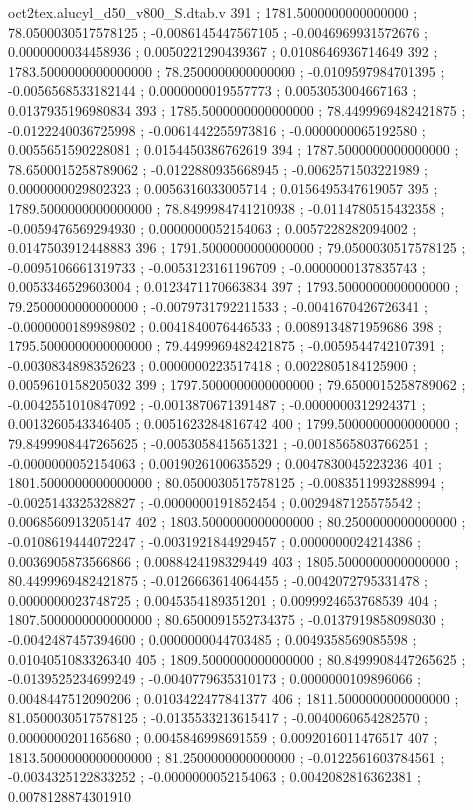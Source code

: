 \begin{filecontents}[overwrite]{oct2tex.alucyl_d50_v800_S.dtab.v}
391 ; 1781.5000000000000000 ; 78.0500030517578125 ; -0.0086145447567105 ; -0.0046969931572676 ; 0.0000000034458936 ; 0.0050221290439367 ; 0.0108646936714649
392 ; 1783.5000000000000000 ; 78.2500000000000000 ; -0.0109597984701395 ; -0.0056568533182144 ; 0.0000000019557773 ; 0.0053053004667163 ; 0.0137935196980834
393 ; 1785.5000000000000000 ; 78.4499969482421875 ; -0.0122240036725998 ; -0.0061442255973816 ; -0.0000000065192580 ; 0.0055651590228081 ; 0.0154450386762619
394 ; 1787.5000000000000000 ; 78.6500015258789062 ; -0.0122880935668945 ; -0.0062571503221989 ; 0.0000000029802323 ; 0.0056316033005714 ; 0.0156495347619057
395 ; 1789.5000000000000000 ; 78.8499984741210938 ; -0.0114780515432358 ; -0.0059476569294930 ; 0.0000000052154063 ; 0.0057228282094002 ; 0.0147503912448883
396 ; 1791.5000000000000000 ; 79.0500030517578125 ; -0.0095106661319733 ; -0.0053123161196709 ; -0.0000000137835743 ; 0.0053346529603004 ; 0.0123471170663834
397 ; 1793.5000000000000000 ; 79.2500000000000000 ; -0.0079731792211533 ; -0.0041670426726341 ; -0.0000000189989802 ; 0.0041840076446533 ; 0.0089134871959686
398 ; 1795.5000000000000000 ; 79.4499969482421875 ; -0.0059544742107391 ; -0.0030834898352623 ; 0.0000000223517418 ; 0.0022805184125900 ; 0.0059610158205032
399 ; 1797.5000000000000000 ; 79.6500015258789062 ; -0.0042551010847092 ; -0.0013870671391487 ; -0.0000000312924371 ; 0.0013260543346405 ; 0.0051623284816742
400 ; 1799.5000000000000000 ; 79.8499908447265625 ; -0.0053058415651321 ; -0.0018565803766251 ; -0.0000000052154063 ; 0.0019026100635529 ; 0.0047830045223236
401 ; 1801.5000000000000000 ; 80.0500030517578125 ; -0.0083511993288994 ; -0.0025143325328827 ; -0.0000000191852454 ; 0.0029487125575542 ; 0.0068560913205147
402 ; 1803.5000000000000000 ; 80.2500000000000000 ; -0.0108619444072247 ; -0.0031921844929457 ; 0.0000000024214386 ; 0.0036905873566866 ; 0.0088424198329449
403 ; 1805.5000000000000000 ; 80.4499969482421875 ; -0.0126663614064455 ; -0.0042072795331478 ; 0.0000000023748725 ; 0.0045354189351201 ; 0.0099924653768539
404 ; 1807.5000000000000000 ; 80.6500091552734375 ; -0.0137919858098030 ; -0.0042487457394600 ; 0.0000000044703485 ; 0.0049358569085598 ; 0.0104051083326340
405 ; 1809.5000000000000000 ; 80.8499908447265625 ; -0.0139525234699249 ; -0.0040779635310173 ; 0.0000000109896066 ; 0.0048447512090206 ; 0.0103422477841377
406 ; 1811.5000000000000000 ; 81.0500030517578125 ; -0.0135533213615417 ; -0.0040060654282570 ; 0.0000000201165680 ; 0.0045846998691559 ; 0.0092016011476517
407 ; 1813.5000000000000000 ; 81.2500000000000000 ; -0.0122561603784561 ; -0.0034325122833252 ; -0.0000000052154063 ; 0.0042082816362381 ; 0.0078128874301910

\end{filecontents}
